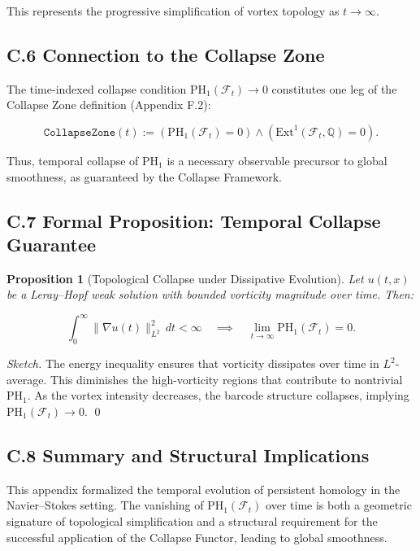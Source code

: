 \documentclass[11pt]{article}
\newtheorem{proposition}[theorem]{Proposition}
\begin{document}
This represents the progressive simplification of vortex topology as \( t \to \infty \).

\subsection*{C.6 Connection to the Collapse Zone}

The time-indexed collapse condition \( \mathrm{PH}_1(\mathcal{F}_t) \to 0 \) constitutes one leg of the Collapse Zone definition (Appendix F.2):

\[
\texttt{CollapseZone}(t) := \left( \mathrm{PH}_1(\mathcal{F}_t) = 0 \right) \land \left( \mathrm{Ext}^1(\mathcal{F}_t, \mathbb{Q}) = 0 \right).
\]

Thus, temporal collapse of \( \mathrm{PH}_1 \) is a necessary observable precursor to global smoothness, as guaranteed by the Collapse Framework.

\subsection*{C.7 Formal Proposition: Temporal Collapse Guarantee}

\begin{proposition}[Topological Collapse under Dissipative Evolution]
Let \( u(t, x) \) be a Leray–Hopf weak solution with bounded vorticity magnitude over time.  
Then:

\[
\int_0^\infty \| \nabla u(t) \|_{L^2}^2 \, dt < \infty
\quad \implies \quad
\lim_{t \to \infty} \mathrm{PH}_1(\mathcal{F}_t) = 0.
\]
\end{proposition}

\begin{proof}[Sketch]
The energy inequality ensures that vorticity dissipates over time in \( L^2 \)-average.  
This diminishes the high-vorticity regions that contribute to nontrivial \( \mathrm{PH}_1 \).  
As the vortex intensity decreases, the barcode structure collapses, implying \( \mathrm{PH}_1(\mathcal{F}_t) \to 0 \).
\hfill \qed
\end{proof}

\subsection*{C.8 Summary and Structural Implications}

This appendix formalized the temporal evolution of persistent homology in the Navier–Stokes setting.  
The vanishing of \( \mathrm{PH}_1(\mathcal{F}_t) \) over time is both a geometric signature of topological simplification  
and a structural requirement for the successful application of the Collapse Functor, leading to global smoothness.
\end{document}

